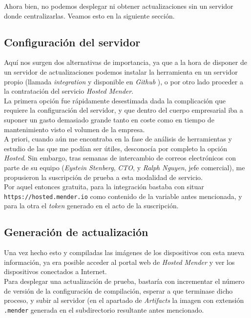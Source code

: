Ahora bien, no podemos desplegar ni obtener actualizaciones sin un servidor donde centralizarlas. Veamos esto en la siguiente sección.

\subsection{Configuración del servidor}

Aquí nos surgen dos alternativas de importancia, ya que a la hora de disponer de un servidor de actualizaciones podemos instalar la herramienta en un servidor propio (llamada \textit{integration} y disponible en \textit{Github} \cite{mender-integration-server}), o por otro lado proceder a la contratación del servicio \textit{Hosted Mender}.\\

La primera opción fue rápidamente desestimada dada la complicación que requiere la configuración del servidor, y que dentro del cuerpo empresarial iba a suponer un gasto demasiado grande tanto en coste como en tiempo de mantenimiento visto el volumen de la empresa.\\

A priori, cuando aún me encontraba en la fase de análisis de herramientas y estudio de las que me podían ser útiles, desconocía por completo la opción \textit{Hosted}. Sin embargo, tras semanas de intercambio de correos electrónicos con parte de su equipo (\textit{Eystein Stenberg}, \textit{CTO}, y \textit{Ralph Nguyen}, jefe comercial), me propusieron la suscripción de prueba a esta modalidad de servicio.\\

Por aquel entonces gratuita, para la integración bastaba con situar \texttt{https://hosted.mender.io} como contenido de la variable antes mencionada, y para la otra el \textit{token} generado en el acto de la suscripción.\\

\subsection{Generación de actualización}

Una vez hecho esto y compiladas las imágenes de los dispositivos con esta nueva información, ya era posible acceder al portal web de \textit{Hosted Mender} y ver los dispositivos conectados a Internet.\\

Para desplegar una actualización de prueba, bastaría con incrementar el número de versión de la configuración de compilación, esperar a que terminase dicho proceso, y subir al servidor (en el apartado de \textit{Artifacts} la imagen con extensión \texttt{.mender} generada en el subdirectorio resultante antes mencionado.

